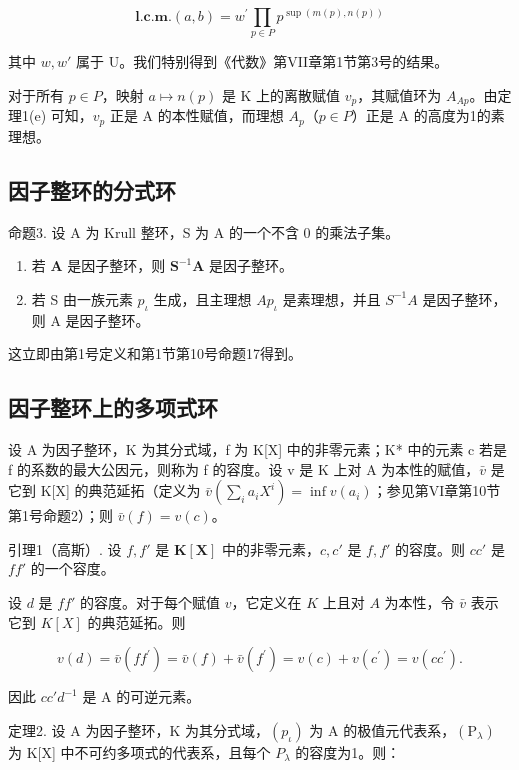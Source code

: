 \[
\mathbf {l . c . m .} (a, b) = w ^ {\prime} \prod_ {p \in P} p ^ {\sup (m (p), n (p))}
\]

其中 \(w, w'\) 属于 U。我们特别得到《代数》第VII章第1节第3号的结果。

对于所有 \(p \in P\)，映射 \(a \mapsto n(p)\) 是 K 上的离散赋值 \(v_{p}\)，其赋值环为 \(A_{Ap}\)。由定理1(e) 可知，\(v_{p}\) 正是 A 的本性赋值，而理想 \(A_{p}\)（\(p \in P\)）正是 A 的高度为1的素理想。

\subsection{因子整环的分式环}

命题3. 设 A 为 Krull 整环，S 为 A 的一个不含 0 的乘法子集。

\begin{enumerate}
\def\labelenumi{(\roman{enumi})}
\item
  若 \(\mathbf{A}\) 是因子整环，则 \(\mathbf{S}^{-1}\mathbf{A}\) 是因子整环。
\item
  若 S 由一族元素 \(p_{\iota}\) 生成，且主理想 \(Ap_{\iota}\) 是素理想，并且 \(S^{-1}A\) 是因子整环，则 A 是因子整环。
\end{enumerate}

这立即由第1号定义和第1节第10号命题17得到。

\subsection{因子整环上的多项式环}

设 A 为因子整环，K 为其分式域，f 为 K{[}X{]} 中的非零元素；K* 中的元素 c 若是 f 的系数的最大公因元，则称为 f 的容度。设 v 是 K 上对 A 为本性的赋值，\(\bar{v}\) 是它到 K{[}X{]} 的典范延拓（定义为 \(\bar{v}\left(\sum_{i}a_{i}X^{i}\right)=\inf v(a_{i})\)；参见第VI章第10节第1号命题2）；则 \(\bar{v}(f)=v(c)\)。

引理1（高斯）. 设 \(f, f'\) 是 \(\mathbf{K}[\mathbf{X}]\) 中的非零元素，\(c, c'\) 是 \(f, f'\) 的容度。则 \(cc'\) 是 \(ff'\) 的一个容度。

设 \(d\) 是 \(ff'\) 的容度。对于每个赋值 \(v\)，它定义在 \(K\) 上且对 \(A\) 为本性，令 \(\bar{v}\) 表示它到 \(K[X]\) 的典范延拓。则

\[
v (d) = \bar {v} (f f ^ {\prime}) = \bar {v} (f) + \bar {v} (f ^ {\prime}) = v (c) + v (c ^ {\prime}) = v (c c ^ {\prime}).
\]

因此 \(cc'd^{-1}\) 是 A 的可逆元素。

定理2. 设 A 为因子整环，K 为其分式域，\((p_{\iota})\) 为 A 的极值元代表系，\((\mathrm{P}_{\lambda})\) 为 K{[}X{]} 中不可约多项式的代表系，且每个 \(P_{\lambda}\) 的容度为1。则：

